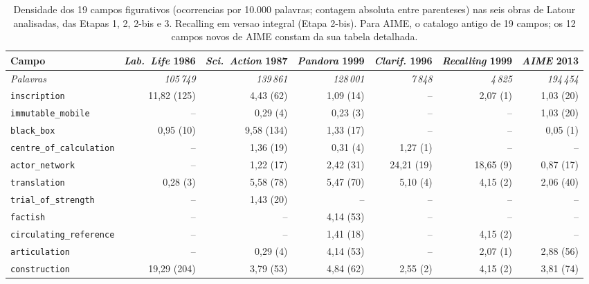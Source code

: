 
\begin{table}[htbp]
\centering
\caption{Densidade dos 19 campos figurativos (ocorrencias por 10.000 palavras; contagem absoluta entre parenteses) nas seis obras de Latour analisadas, das Etapas 1, 2, 2-bis e 3. Recalling em versao integral (Etapa 2-bis). Para AIME, o catalogo antigo de 19 campos; os 12 campos novos de AIME constam da sua tabela detalhada.}
\label{tab:campos-comparativa-etapas}
\scriptsize
\begin{tabular}{lrrrrrr}
\toprule
Campo & \emph{Lab.\ Life} 1986 & \emph{Sci.\ Action} 1987 & \emph{Pandora} 1999 & \emph{Clarif.} 1996 & \emph{Recalling} 1999 & \emph{AIME} 2013 \\
\midrule
\textit{Palavras} & \textit{105\,749} & \textit{139\,861} & \textit{128\,001} & \textit{7\,848} & \textit{4\,825} & \textit{194\,454} \\
\midrule
\texttt{inscription} & 11{,}82 (125) & 4{,}43 (62) & 1{,}09 (14) & -- & 2{,}07 (1) & 1{,}03 (20) \\
\texttt{immutable\_mobile} & -- & 0{,}29 (4) & 0{,}23 (3) & -- & -- & 1{,}03 (20) \\
\texttt{black\_box} & 0{,}95 (10) & 9{,}58 (134) & 1{,}33 (17) & -- & -- & 0{,}05 (1) \\
\texttt{centre\_of\_calculation} & -- & 1{,}36 (19) & 0{,}31 (4) & 1{,}27 (1) & -- & -- \\
\texttt{actor\_network} & -- & 1{,}22 (17) & 2{,}42 (31) & 24{,}21 (19) & 18{,}65 (9) & 0{,}87 (17) \\
\texttt{translation} & 0{,}28 (3) & 5{,}58 (78) & 5{,}47 (70) & 5{,}10 (4) & 4{,}15 (2) & 2{,}06 (40) \\
\texttt{trial\_of\_strength} & -- & 1{,}43 (20) & -- & -- & -- & -- \\
\texttt{factish} & -- & -- & 4{,}14 (53) & -- & -- & -- \\
\texttt{circulating\_reference} & -- & -- & 1{,}41 (18) & -- & 4{,}15 (2) & -- \\
\texttt{articulation} & -- & 0{,}29 (4) & 4{,}14 (53) & -- & 2{,}07 (1) & 2{,}88 (56) \\
\texttt{construction} & 19{,}29 (204) & 3{,}79 (53) & 4{,}84 (62) & 2{,}55 (2) & 4{,}15 (2) & 3{,}81 (74) \\

\end{tabular}
\end{table}
